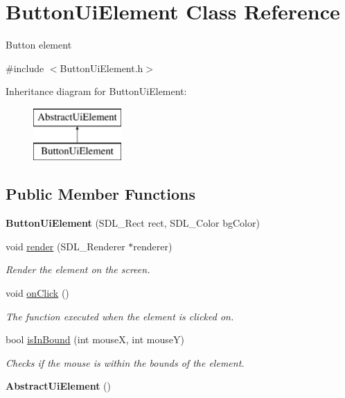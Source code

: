 \hypertarget{class_button_ui_element}{}\section{Button\+Ui\+Element Class Reference}
\label{class_button_ui_element}


Button element  




{\ttfamily \#include $<$Button\+Ui\+Element.\+h$>$}

Inheritance diagram for Button\+Ui\+Element\+:\begin{figure}[H]
\begin{center}
\leavevmode
\includegraphics[height=2.000000cm]{class_button_ui_element}
\end{center}
\end{figure}
\subsection*{Public Member Functions}
\begin{DoxyCompactItemize}
\item 
\mbox{\label{class_button_ui_element_a1347bd46d314e4c08e499d1d65bc85c1}} 
{\bfseries Button\+Ui\+Element} (S\+D\+L\+\_\+\+Rect rect, S\+D\+L\+\_\+\+Color bg\+Color)
\item 
void \mbox{\hyperlink{class_button_ui_element_ad319e20e8abedefe07aef58a38ae9a81}{render}} (S\+D\+L\+\_\+\+Renderer $\ast$renderer)
\begin{DoxyCompactList}\small\item\em Render the element on the screen. \end{DoxyCompactList}\item 
void \mbox{\hyperlink{class_button_ui_element_a06c748ef9e81216f76d7db936d320365}{on\+Click}} ()
\begin{DoxyCompactList}\small\item\em The function executed when the element is clicked on. \end{DoxyCompactList}\item 
bool \mbox{\hyperlink{class_button_ui_element_ab321d646770df66f7ea58a7246d7bf28}{is\+In\+Bound}} (int mouseX, int mouseY)
\begin{DoxyCompactList}\small\item\em Checks if the mouse is within the bounds of the element. \end{DoxyCompactList}\item 
\mbox{\label{class_button_ui_element_a24799afea36fcb1135b9477f1da3498d}} 
{\bfseries Abstract\+Ui\+Element} ()
\end{DoxyCompactItemize}
